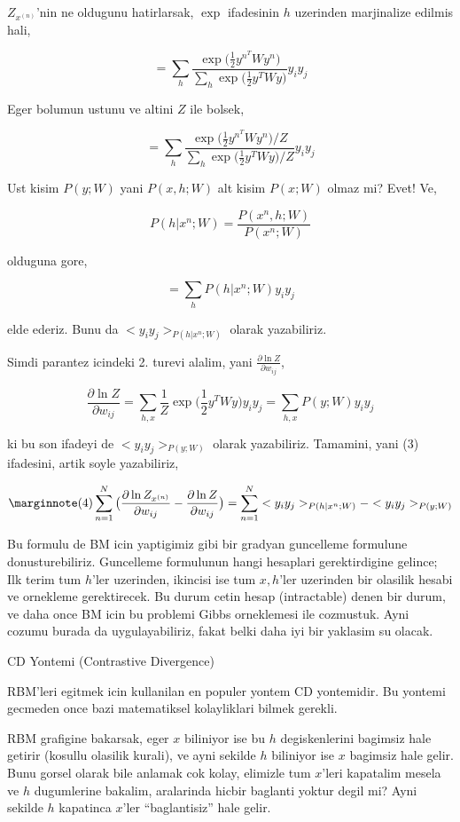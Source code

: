 \documentclass[12pt,fleqn]{article}\usepackage{../common}
\begin{document}
$Z_{x^{(n)}}$'nin ne oldugunu hatirlarsak, $\exp$ ifadesinin $h$ uzerinden
marjinalize edilmis hali,

$$ 
= \sum_h  \frac{\exp \big( \frac{1}{2} y^{n^T} W y^n  \big)}
{\sum_h \exp \big( \frac{1}{2} y^T W y \big) } 
y_iy_j
$$

Eger bolumun ustunu ve altini $Z$ ile bolsek,

$$ 
= \sum_h  
\frac{\exp \big( \frac{1}{2} y^{n^T} W y^n  \big) / Z} 
{\sum_h \exp \big( \frac{1}{2} y^T W y \big) / Z} 
y_iy_j
$$

Ust kisim $P(y;W)$ yani $P(x,h;W) $ alt kisim $P(x;W)$ olmaz mi? Evet! Ve,


$$ P(h|x^n;W) = \frac{P(x^n,h;W)}{P(x^n;W)}  $$

olduguna gore, 

$$ =  \sum_h P(h|x^n;W) y_iy_j $$

elde ederiz. Bunu da $<y_iy_j>_{P(h|x^n;W)}$ olarak yazabiliriz. 

Simdi parantez icindeki 2. turevi alalim, yani $\frac{\partial \ln Z }{\partial w_{ij}} $,

$$ 
\frac{\partial \ln Z }{\partial w_{ij}}  = 
\sum_{h,x} \frac{1}{Z}  \exp \big( \frac{1}{2} y^{T} W y  \big) y_iy_j =
\sum_{h,x} P(y;W)  y_iy_j
$$

ki bu son ifadeyi de $<y_iy_j>_{P(y;W)}$ olarak yazabiliriz. Tamamini,
yani (3) ifadesini, artik soyle yazabiliriz,

$$
\mlabel{4}
\sum_{n=1}^{N}  \big( \frac{\partial \ln Z_{x^{(n)}} }{\partial w_{ij}} - \frac{\partial \ln Z }{\partial w_{ij}} \big)
= \sum_{n=1}^{N}  <y_iy_j>_{P(h|x^n;W)} - <y_iy_j>_{P(y;W)}
$$

Bu formulu de BM icin yaptigimiz gibi bir gradyan guncelleme formulune
donusturebiliriz. Guncelleme formulunun hangi hesaplari gerektirdigine
gelince; Ilk terim tum $h$'ler uzerinden, ikincisi ise tum $x,h$'ler
uzerinden bir olasilik hesabi ve ornekleme gerektirecek. Bu durum cetin
hesap (intractable) denen bir durum, ve daha once BM icin bu problemi Gibbs
orneklemesi ile cozmustuk. Ayni cozumu burada da uygulayabiliriz, fakat
belki daha iyi bir yaklasim su olacak. 

CD Yontemi (Contrastive Divergence) 

RBM'leri egitmek icin kullanilan en populer yontem CD yontemidir. Bu
yontemi gecmeden once bazi matematiksel kolayliklari bilmek gerekli. 

RBM grafigine bakarsak, eger $x$ biliniyor ise bu $h$ degiskenlerini
bagimsiz hale getirir (kosullu olasilik kurali), ve ayni sekilde $h$
biliniyor ise $x$ bagimsiz hale gelir. Bunu gorsel olarak bile anlamak cok
kolay, elimizle tum $x$'leri kapatalim mesela ve $h$ dugumlerine bakalim,
aralarinda hicbir baglanti yoktur degil mi? Ayni sekilde $h$ kapatinca
$x$'ler ``baglantisiz'' hale gelir. 
\end{document}
